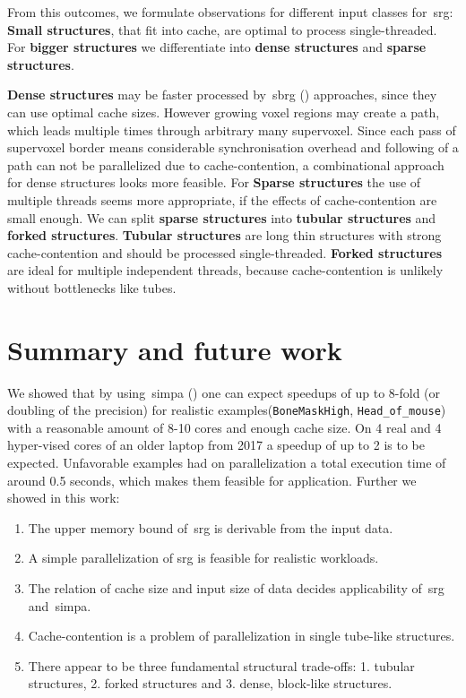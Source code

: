 \documentclass{article}
\begin{document}
From this outcomes, we formulate observations for different input classes for~\ac{srg}:
\textbf{Small structures}, that fit into cache, are optimal to process single-threaded.
For \textbf{bigger structures} we differentiate into \textbf{dense structures} and \textbf{sparse structures}.\par
\textbf{Dense structures} may be faster processed by~\ac{sbrg} () approaches, since they can use optimal cache sizes.
However growing voxel regions may create a path, which leads multiple times through arbitrary many supervoxel.
Since each pass of supervoxel border means considerable synchronisation overhead and following of a path can not be parallelized due to cache-contention, a combinational approach for dense structures looks more feasible.
For \textbf{Sparse structures} the use of multiple threads seems more appropriate, if the effects of cache-contention are small enough.
We can split \textbf{sparse structures} into \textbf{tubular structures} and \textbf{forked structures}.
\textbf{Tubular structures} are long thin structures with strong cache-contention and should be processed single-threaded.
\textbf{Forked structures} are ideal for multiple independent threads, because cache-contention is unlikely without bottlenecks like tubes.\par

\section{Summary and future work}\label{sec:summary_futurework}
\acresetall
We showed that by using~\ac{simpa} () one can expect speedups of up to 8-fold (or doubling of the precision) for realistic examples(\texttt{BoneMaskHigh}, \texttt{Head\_of\_mouse}) with a reasonable amount of 8-10 cores and enough cache size.
On 4 real and 4 hyper-vised cores of an older laptop from 2017 a speedup of up to 2 is to be expected.
Unfavorable examples had on parallelization a total execution time of around 0.5 seconds, which makes them feasible for application.
Further we showed in this work:
\begin{enumerate}
  \item The upper memory bound of~\ac{srg} is derivable from the input data.
  \item A simple parallelization of \ac{srg} is feasible for realistic workloads.
  \item The relation of cache size and input size of data decides applicability of~\ac{srg} and~\ac{simpa}.
  \item Cache-contention is a problem of parallelization in single tube-like structures.
  \item There appear to be three fundamental structural trade-offs: 1. tubular structures, 2. forked structures and 3. dense, block-like structures.
\end{enumerate}
\end{document}
